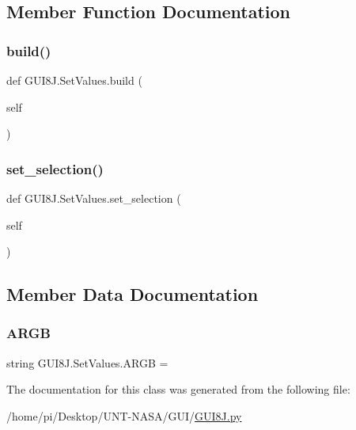 \subsection{Member Function Documentation}
\mbox{\label{classGUI8J_1_1SetValues_ac327a506ed4ef380a0e6cffdc7125a94}} 
\subsubsection{\texorpdfstring{build()}{build()}}
{\footnotesize\ttfamily def G\+U\+I8\+J.\+Set\+Values.\+build (\begin{DoxyParamCaption}\item[{}]{self }\end{DoxyParamCaption})}

\mbox{\label{classGUI8J_1_1SetValues_ad395153098290dc55aa98bb3cbe15a44}} 
\subsubsection{\texorpdfstring{set\+\_\+selection()}{set\_selection()}}
{\footnotesize\ttfamily def G\+U\+I8\+J.\+Set\+Values.\+set\+\_\+selection (\begin{DoxyParamCaption}\item[{}]{self }\end{DoxyParamCaption})}



\subsection{Member Data Documentation}
\mbox{\label{classGUI8J_1_1SetValues_a51db2b8ea02f885122e64c2dbe632705}} 
\subsubsection{\texorpdfstring{A\+R\+GB}{ARGB}}
{\footnotesize\ttfamily string G\+U\+I8\+J.\+Set\+Values.\+A\+R\+GB = \textquotesingle{}\textquotesingle{}\hspace{0.3cm}{\ttfamily [static]}}



The documentation for this class was generated from the following file\+:\begin{DoxyCompactItemize}
\item 
/home/pi/\+Desktop/\+U\+N\+T-\/\+N\+A\+S\+A/\+G\+U\+I/\hyperlink{GUI8J_8py}{G\+U\+I8\+J.\+py}\end{DoxyCompactItemize}
